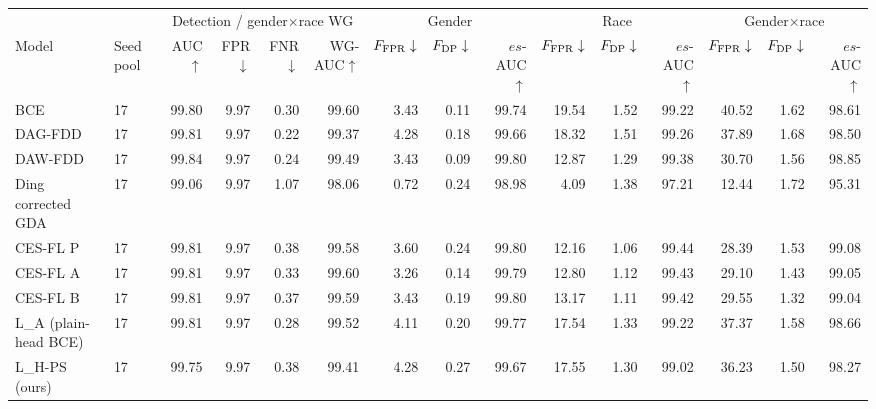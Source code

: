\documentclass[10pt]{article}
\begin{document}
{\fontsize{7.6}{9.1}\selectfont\setlength{\tabcolsep}{3pt}
\renewcommand{\arraystretch}{1.05}
\begin{tabular*}{\linewidth}{@{\extracolsep{\fill}}llrrrrrrrrrrrrr}\toprule
 & & \multicolumn{4}{c}{Detection / gender$\times$race WG} & \multicolumn{3}{c}{Gender} & \multicolumn{3}{c}{Race} & \multicolumn{3}{c}{Gender$\times$race}\\
Model & Seed pool & AUC$\uparrow$ & FPR$\downarrow$ & FNR$\downarrow$ & WG-AUC$\uparrow$ & $F_{\rm FPR}\downarrow$ & $F_{\rm DP}\downarrow$ & $es$-AUC$\uparrow$ & $F_{\rm FPR}\downarrow$ & $F_{\rm DP}\downarrow$ & $es$-AUC$\uparrow$ & $F_{\rm FPR}\downarrow$ & $F_{\rm DP}\downarrow$ & $es$-AUC$\uparrow$\\\midrule
BCE & 17 & 99.80 & 9.97 & 0.30 & 99.60 & 3.43 & 0.11 & 99.74 & 19.54 & 1.52 & 99.22 & 40.52 & 1.62 & 98.61\\
DAG-FDD & 17 & 99.81 & 9.97 & 0.22 & 99.37 & 4.28 & 0.18 & 99.66 & 18.32 & 1.51 & 99.26 & 37.89 & 1.68 & 98.50\\
DAW-FDD & 17 & 99.84 & 9.97 & 0.24 & 99.49 & 3.43 & 0.09 & 99.80 & 12.87 & 1.29 & 99.38 & 30.70 & 1.56 & 98.85\\
Ding corrected GDA & 17 & 99.06 & 9.97 & 1.07 & 98.06 & 0.72 & 0.24 & 98.98 & 4.09 & 1.38 & 97.21 & 12.44 & 1.72 & 95.31\\
CES-FL P & 17 & 99.81 & 9.97 & 0.38 & 99.58 & 3.60 & 0.24 & 99.80 & 12.16 & 1.06 & 99.44 & 28.39 & 1.53 & 99.08\\
CES-FL A & 17 & 99.81 & 9.97 & 0.33 & 99.60 & 3.26 & 0.14 & 99.79 & 12.80 & 1.12 & 99.43 & 29.10 & 1.43 & 99.05\\
CES-FL B & 17 & 99.81 & 9.97 & 0.37 & 99.59 & 3.43 & 0.19 & 99.80 & 13.17 & 1.11 & 99.42 & 29.55 & 1.32 & 99.04\\
L\_A (plain-head BCE) & 17 & 99.81 & 9.97 & 0.28 & 99.52 & 4.11 & 0.20 & 99.77 & 17.54 & 1.33 & 99.22 & 37.37 & 1.58 & 98.66\\
L\_H-PS (ours) & 17 & 99.75 & 9.97 & 0.38 & 99.41 & 4.28 & 0.27 & 99.67 & 17.55 & 1.30 & 99.02 & 36.23 & 1.50 & 98.27\\

\end{tabular*}}
\end{document}
